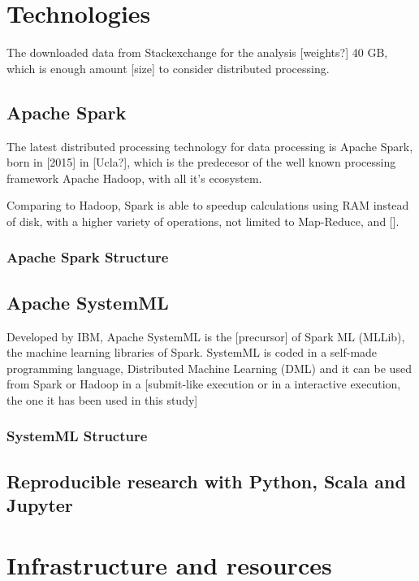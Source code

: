 \documentclass[11pt]{article} %
\begin{document}
\section{Technologies}

The downloaded data from Stackexchange for the analysis [weights?] 40 GB, which is enough amount [size] to consider distributed processing.

\subsection{Apache Spark}

The latest distributed processing technology for data processing is Apache Spark, born in [2015] in [Ucla?], which is the predecesor of the well known processing framework Apache Hadoop, with all it's ecosystem.

Comparing to Hadoop, Spark is able to speedup calculations using RAM instead of disk, with a higher variety of operations, not limited to Map-Reduce,  and [].

\subsubsection{Apache Spark Structure}




\subsection{Apache SystemML}

Developed by IBM, Apache SystemML is the [precursor] of Spark ML (MLLib), the machine learning libraries of Spark.
SystemML is coded in a self-made programming language, Distributed Machine Learning (DML) and it can be used from Spark or Hadoop in a [submit-like execution or in a interactive execution, the one it has been used in this study]

\subsubsection{SystemML Structure}



\subsection{Reproducible research with Python, Scala and Jupyter}



\section{Infrastructure and resources}
\end{document}

